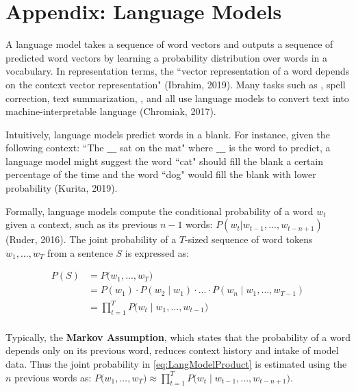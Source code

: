 \section{Appendix: Language Models} \label{sec:LanguageModels} %

A language model takes a sequence of word vectors and outputs a sequence of predicted word vectors by learning a probability distribution over words in a vocabulary. In representation terms, the ``vector representation of a word depends on the context vector representation" (Ibrahim, 2019). Many tasks such as , spell correction, text summarization, , and  all use language models to convert text into machine-interpretable language (Chromiak, 2017). 

Intuitively, language models predict words in a blank. For instance, given the following context: ``The $\_\_\_$ sat on the mat" where $\_\_\_$ is the word to predict, a language model might suggest the word ``cat" should fill the blank a certain percentage of the time and the word ``dog" would fill the blank with lower probability (Kurita, 2019). 

Formally, language models compute the conditional probability of a word $w_t$ given a context, such as its previous $n-1$ words: $P(w_t | w_{t-1}, ..., w_{t-n+1})$ (Ruder, 2016). The joint probability of a $T$-sized sequence of word tokens $w_1, ..., w_T$ from a sentence $S$ is expressed as:

\begin{equation}
\begin{array}{ll}
P(S)
&= P \Big(w_1, ..., w_T \Big)  \\
&= P(w_1) \cdot P(w_2 \; | \; w_1) \cdot ... \cdot P(w_n \; | \; w_1, ..., w_{T-1}) \\
&= \prod_{t=1}^T P \Big(w_t \; | \; w_1, ..., w_{t-1} \Big) \\
\end{array}
\label{eq:LangModelProduct}
\end{equation}

Typically, the \textbf{Markov Assumption}, which states that the probability of a word depends only on its previous word, reduces context history and intake of model data. Thus the joint probability in \cref{eq:LangModelProduct} is estimated using the $n$ previous words as: $P \Big(w_1, ..., w_T \Big) \approx \prod_{t=1}^T P \Big(w_t \; | \; w_{t-1}, ..., w_{t-n+1} \Big)$.



